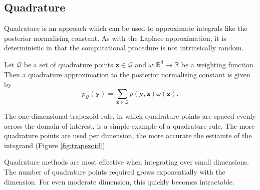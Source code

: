 \documentclass[a4paper, nobind]{templates/ociamthesis}
\begin{document}
\hypertarget{quadrature}{%
\subsection{Quadrature}\label{quadrature}}

Quadrature is an approach which can be used to approximate integrals like the posterior normalising constant.
As with the Laplace approximation, it is deterministic in that the computational procedure is not intrinsically random.

Let \(\mathcal{Q}\) be a set of quadrature points \(\mathbf{z} \in \mathcal{Q}\) and \(\omega: \mathbb{R}^d \to \mathbb{R}\) be a weighting function.
Then a quadrature approximation to the posterior normalising constant is given by
\begin{equation}
\tilde p_{\mathcal{Q}}(\mathbf{y}) = \sum_{\mathbf{z} \in \mathcal{Q}} p(\mathbf{y}, \mathbf{z}) \omega(\mathbf{z}).
\end{equation}

The one-dimensional trapezoid rule, in which quadrature points are spaced evenly across the domain of interest, is a simple example of a quadrature rule.
The more quadrature points are used per dimension, the more accurate the estiamte of the integrand (Figure \ref{fig:trapezoid}).

Quadrature methods are most effective when integrating over small dimensions.
The number of quadrature points required grows exponentially with the dimension.
For even moderate dimension, this quickly becomes intractable.
\end{document}
